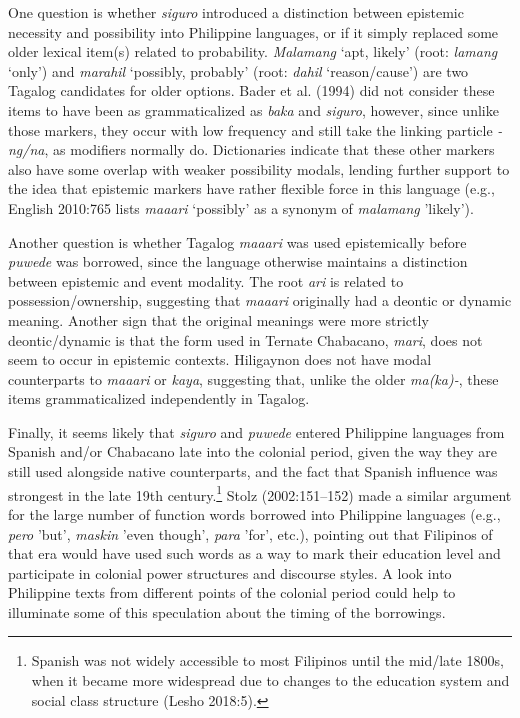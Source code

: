 \begin{styleStandard}
One question is whether \textit{siguro }introduced a distinction between epistemic necessity and possibility into Philippine languages, or if it simply replaced some older lexical item(s) related to probability. \textit{Malamang }‘apt, likely’ (root: \textit{lamang }‘only’) and \textit{marahil }‘possibly, probably’ (root: \textit{dahil }‘reason/cause’) are two Tagalog candidates for older options. Bader et al. (1994) did not consider these items to have been as grammaticalized as \textit{baka} and \textit{siguro}, however, since unlike those markers, they occur with low frequency and still take the linking particle \textit{{}-ng/na}, as modifiers normally do. Dictionaries indicate that these other markers also have some overlap with weaker possibility modals, lending further support to the idea that epistemic markers have rather flexible force in this language (e.g., English 2010:765 lists \textit{maaari} ‘possibly’ as a synonym of \textit{malamang} 'likely'). 
\end{styleStandard}

\begin{styleStandard}
Another question is whether Tagalog \textit{maaari} was used epistemically before \textit{puwede }was borrowed, since the language otherwise maintains a distinction between epistemic and event modality. The root \textit{ari} is related to possession/ownership, suggesting that \textit{maaari} originally had a deontic or dynamic meaning. Another sign that the original meanings were more strictly deontic/dynamic is that the form used in Ternate Chabacano, \textit{mari}, does not seem to occur in epistemic contexts. Hiligaynon does not have modal counterparts to \textit{maaari} or \textit{kaya}, suggesting that, unlike the older \textit{ma(ka)-}, these items grammaticalized independently in Tagalog. 
\end{styleStandard}

\begin{styleStandard}
Finally, it seems likely that \textit{siguro }and \textit{puwede }entered Philippine languages from Spanish and/or Chabacano late into the colonial period, given the way they are still used alongside native counterparts, and the fact that Spanish influence was strongest in the late 19th century.\footnote{ Spanish was not widely accessible to most Filipinos until the mid/late 1800s, when it became more widespread due to changes to the education system and social class structure (Lesho 2018:5). } Stolz (2002:151–152) made a similar argument for the large number of function words borrowed into Philippine languages (e.g., \textit{pero} 'but', \textit{maskin} 'even though', \textit{para} 'for', etc.), pointing out that Filipinos of that era would have used such words as a way to mark their education level and participate in colonial power structures and discourse styles. A look into Philippine texts from different points of the colonial period could help to illuminate some of this speculation about the timing of the borrowings.
\end{styleStandard}

